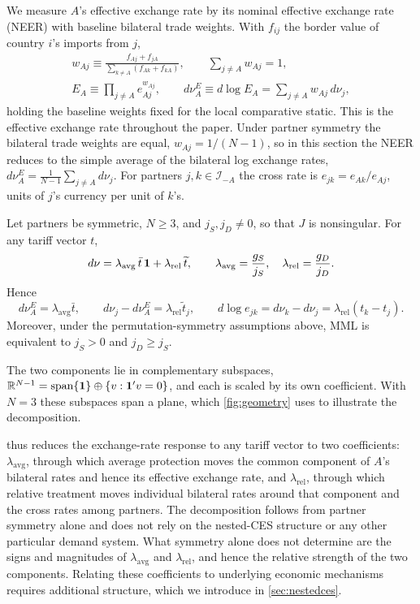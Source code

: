 We measure $A$'s effective exchange rate by its nominal effective exchange rate (NEER) with baseline bilateral trade weights. With $f_{ij}$ the border value of country $i$'s imports from $j$,
\begin{gather*}
w_{Aj}\equiv\frac{f_{Aj}+f_{jA}}{\sum_{k\neq A}(f_{Ak}+f_{kA})},\qquad \sum_{j\neq A}w_{Aj}=1,\\
E_A\equiv\prod_{j\neq A}e_{Aj}^{w_{Aj}},\qquad
d\nu^E_A\equiv d\log E_A=\sum_{j\neq A}w_{Aj}\,d\nu_j,
\end{gather*}
holding the baseline weights fixed for the local comparative static. This is the effective exchange rate throughout the paper. Under partner symmetry the bilateral trade weights are equal, $w_{Aj}=1/(N-1)$, so in this section the NEER reduces to the simple average of the bilateral log exchange rates, $d\nu^E_A=\frac{1}{N-1}\sum_{j\neq A}d\nu_j$. For partners $j,k\in\mathcal I_{-A}$ the cross rate is $e_{jk}=e_{Ak}/e_{Aj}$, units of $j$'s currency per unit of $k$'s.

\begin{proposition}
\label{prop:decomposition}
Let partners be symmetric, $N\geq3$, and $j_S,j_D\neq0$, so that $J$ is nonsingular. For any tariff vector $t$,
\begin{equation}
d\nu=\lambda_{\mathrm{avg}}\,\bar t\,\mathbf{1}+\lambda_{\mathrm{rel}}\,\widetilde t,\qquad \lambda_{\mathrm{avg}}=\frac{g_S}{j_S},\quad \lambda_{\mathrm{rel}}=\frac{g_D}{j_D}.
\label{eq:decomp}
\end{equation}
Hence
\begin{equation}
d\nu^E_A=\lambda_{\mathrm{avg}}\bar t,\qquad d\nu_j-d\nu^E_A=\lambda_{\mathrm{rel}}\widetilde t_j,\qquad d\log e_{jk}=d\nu_k-d\nu_j=\lambda_{\mathrm{rel}}(t_k-t_j).
\label{eq:decompparts}
\end{equation}
Moreover, under the permutation-symmetry assumptions above, MML is equivalent to $j_S>0$ and $j_D\geq j_S$.
\end{proposition}

The two components lie in complementary subspaces, $\mathbb R^{N-1}=\operatorname{span}\{\mathbf{1}\}\oplus\{v:\mathbf{1}'v=0\}$, and each is scaled by its own coefficient. With $N=3$ these subspaces span a plane, which \cref{fig:geometry} uses to illustrate the decomposition.

 thus reduces the exchange-rate response to any tariff vector to two coefficients: $\lambda_{\mathrm{avg}}$, through which average protection moves the common component of $A$'s bilateral rates and hence its effective exchange rate, and $\lambda_{\mathrm{rel}}$, through which relative treatment moves individual bilateral rates around that component and the cross rates among partners. The decomposition follows from partner symmetry alone and does not rely on the nested-CES structure or any other particular demand system. What symmetry alone does not determine are the signs and magnitudes of $\lambda_{\mathrm{avg}}$ and $\lambda_{\mathrm{rel}}$, and hence the relative strength of the two components. Relating these coefficients to underlying economic mechanisms requires additional structure, which we introduce in \cref{sec:nestedces}.
